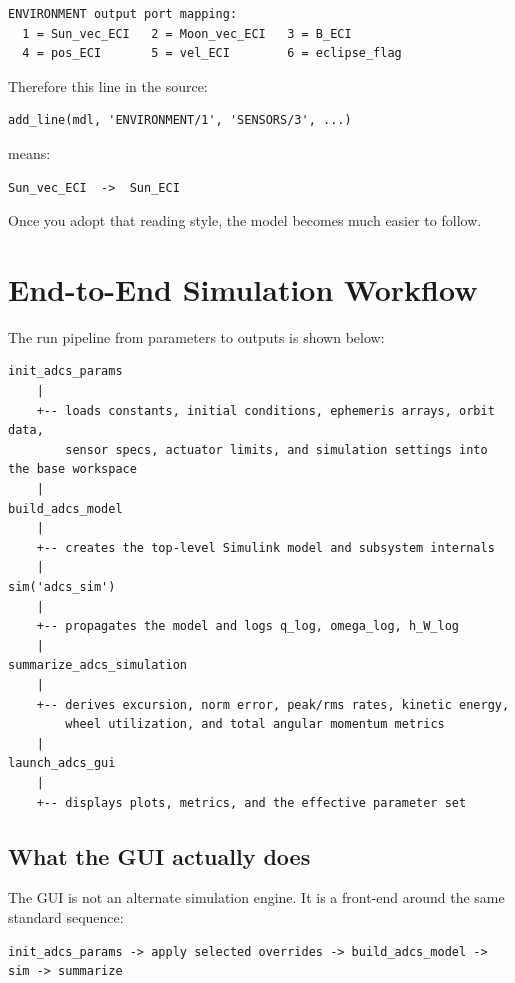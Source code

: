\documentclass[11pt]{article}
\begin{document}
\begin{verbatim}
ENVIRONMENT output port mapping:
  1 = Sun_vec_ECI   2 = Moon_vec_ECI   3 = B_ECI
  4 = pos_ECI       5 = vel_ECI        6 = eclipse_flag
\end{verbatim}

Therefore this line in the source:

\begin{verbatim}
add_line(mdl, 'ENVIRONMENT/1', 'SENSORS/3', ...)
\end{verbatim}

means:

\begin{verbatim}
Sun_vec_ECI  ->  Sun_ECI
\end{verbatim}

Once you adopt that reading style, the model becomes much easier to follow.

\section{End-to-End Simulation Workflow}

The run pipeline from parameters to outputs is shown below:

\begin{verbatim}
init_adcs_params
    |
    +-- loads constants, initial conditions, ephemeris arrays, orbit data,
        sensor specs, actuator limits, and simulation settings into the base workspace
    |
build_adcs_model
    |
    +-- creates the top-level Simulink model and subsystem internals
    |
sim('adcs_sim')
    |
    +-- propagates the model and logs q_log, omega_log, h_W_log
    |
summarize_adcs_simulation
    |
    +-- derives excursion, norm error, peak/rms rates, kinetic energy,
        wheel utilization, and total angular momentum metrics
    |
launch_adcs_gui
    |
    +-- displays plots, metrics, and the effective parameter set
\end{verbatim}

\subsection{What the GUI actually does}

The GUI is not an alternate simulation engine. It is a front-end around the same standard sequence:

\begin{verbatim}
init_adcs_params -> apply selected overrides -> build_adcs_model -> sim -> summarize
\end{verbatim}
\end{document}

